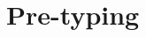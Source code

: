 
\newpage
\section*{Pre-typing}

\ocwsection \label{pretyping}

\bigskip
\begin{center}\end{center}


